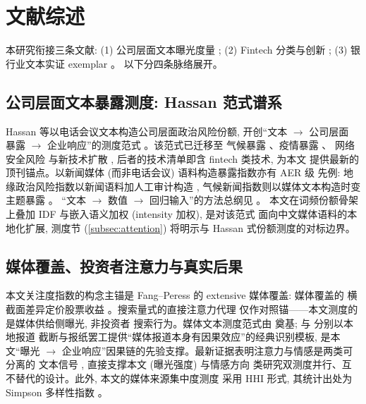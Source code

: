 \section{文献综述}\label{sec:lit}
本研究衔接三条文献:
(1) 公司层面文本曝光度量 \autocite{hassan2019firm,florackis2023cybersecurity};
(2) Fintech 分类与创新 \autocite{gomber2018fintech,goldstein2019fintech};
(3) 银行业文本实证 exemplar \autocite{engelberg2018short}。
以下分四条脉络展开。

\subsection{公司层面文本暴露测度: Hassan 范式谱系}
Hassan 等以电话会议文本构造公司层面政治风险份额, 开创``文本 $\to$ 公司层面
暴露 $\to$ 企业响应''的测度范式 \parencite{hassan2019firm}。该范式已迁移至
气候暴露 \parencite{sautner2023climate}、疫情暴露 \parencite{hassan2023epidemic}、
网络安全风险 \parencite{florackis2023cybersecurity} 与新技术扩散
\parencite{kalyani2025diffusion}, 后者的技术清单即含 fintech 类技术, 为本文
提供最新的顶刊锚点。以新闻媒体 (而非电话会议) 语料构造暴露指数亦有 AER 级
先例: 地缘政治风险指数以新闻语料加人工审计构造 \parencite{caldara2022geopolitical},
气候新闻指数则以媒体文本构造时变主题暴露 \parencite{engle2020hedging}。
``文本 $\to$ 数值 $\to$ 回归输入''的方法总纲见 \textcite{gentzkow2019text}。
本文在词频份额骨架上叠加 IDF 与嵌入语义加权 (intensity 加权), 是对该范式
面向中文媒体语料的本地化扩展, 测度节 (\ref{subsec:attention}) 将明示与
Hassan 式份额测度的对标边界。

\subsection{媒体覆盖、投资者注意力与真实后果}
本文关注度指数的构念主锚是 Fang--Peress 的 extensive 媒体覆盖: 媒体覆盖的
横截面差异定价股票收益 \parencite{fang2009media}。搜索量式的直接注意力代理
\parencite{da2011attention} 仅作对照锚——本文测度的是媒体供给侧曝光, 非投资者
搜索行为。媒体文本测度范式由 \textcite{tetlock2007content} 奠基;
\textcite{engelberg2011causal} 与 \textcite{peress2014strikes} 分别以本地报道
截断与报纸罢工提供``媒体报道本身有因果效应''的经典识别模板, 是本文``曝光
$\to$ 企业响应''因果链的先验支撑。最新证据表明注意力与情感是两类可分离的
文本信号 \parencite{cookson2024social}, 直接支撑本文 (曝光强度) 与情感方向
类研究双测度并行、互不替代的设计。此外, 本文的媒体来源集中度测度
 采用 HHI 形式, 其统计出处为 Simpson 多样性指数
\parencite{simpson1949diversity}。

